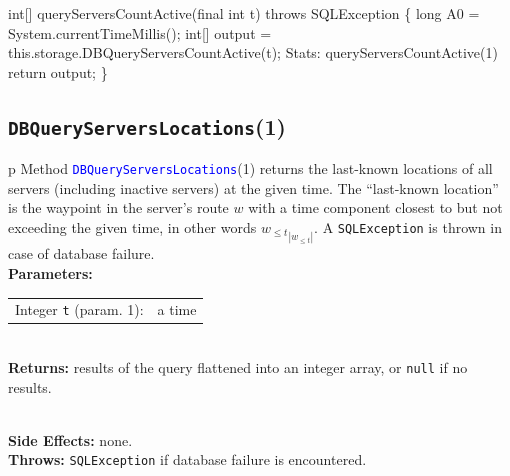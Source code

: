 int[] queryServersCountActive(final int t) throws SQLException \{
  long A0 = System.currentTimeMillis();
  int[] output = this.storage.DBQueryServersCountActive(t);
  \LA{}Stats: queryServersCountActive(1)~{\nwtagstyle{}}\RA{}
  return output;
\}
\eatline
{}\nwendcode{}\nwdocspar
\subsection{\texttt{DBQueryServersLocations}(1)}
\begin{tabular}{p{\textwidth}}
\toprule
{}
Method \textcolor{blue}{{\tt{}\protect{}DBQueryServersLocations}}(1) returns the
last-known locations of all servers (including inactive servers) at the given
time. The ``last-known location'' is the waypoint in the server's route $w$
with a time component closest to but not exceeding the given time, in other
words ${w_{\leq t}}_{|w_{\leq t}|}$.
A {\tt{}SQLException} is thrown in case of database failure.\\
\midrule
\textbf{Parameters:} \\
\begin{tabular}{lp{116mm}}
Integer {\tt{}t} (param. 1):&a time
\end{tabular}\\
\textbf{Returns:} results of the query flattened into an integer array, or
{\tt{}null} if no results.

\\
\textbf{Side Effects:} none.\\
\textbf{Throws:} {\tt{}SQLException} if database failure is encountered.\\
\bottomrule
\end{tabular}
